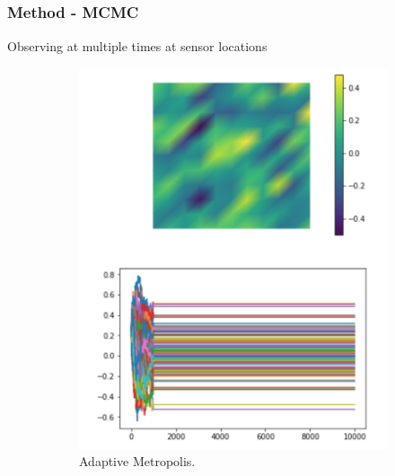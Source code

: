 \documentclass[9pt]{beamer}
\begin{document}
\subsection{}
\begin{frame}
\frametitle{Method - MCMC}
Observing at multiple times at sensor locations
\begin{figure}
\hspace{-1cm}
\begin{subfigure}{0.3\textwidth}
\vspace{-0.3cm}
	\includegraphics[scale = 0.3]{AM_noObs.png}
	\caption{Adaptive Metropolis.}
\end {subfigure}
\hspace{0.7cm}
\begin{subfigure}{0.3\textwidth}

\end{subfigure}
\end{figure}
\end{frame}
\end{document}
